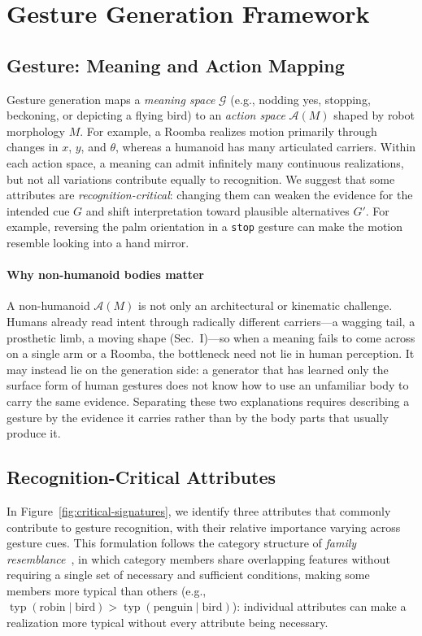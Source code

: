 \documentclass[letterpaper,10pt,conference]{ieeeconf}
\begin{document}
\section{Gesture Generation Framework}
\label{sec:gesture}

\subsection{Gesture: Meaning and Action Mapping}

Gesture generation maps a \emph{meaning space} $\mathcal{G}$ (e.g., nodding yes, stopping, beckoning, or depicting a flying bird) to an \emph{action space} $\mathcal{A}(M)$ shaped by robot morphology $M$. For example, a Roomba realizes motion primarily through changes in $x$, $y$, and $\theta$, whereas a humanoid has many articulated carriers. Within each action space, a meaning can admit infinitely many continuous realizations, but not all variations contribute equally to recognition. We suggest that some attributes are \emph{recognition-critical}: changing them can weaken the evidence for the intended cue $G$ and shift interpretation toward plausible alternatives $G'$. For example, reversing the palm orientation in a \texttt{stop} gesture can make the motion resemble looking into a hand mirror.

\paragraph{Why non-humanoid bodies matter}
A non-humanoid $\mathcal{A}(M)$ is not only an architectural or kinematic challenge. Humans already read intent through radically different carriers---a wagging tail, a prosthetic limb, a moving shape (Sec.~I)---so when a meaning fails to come across on a single arm or a Roomba, the bottleneck need not lie in human perception. It may instead lie on the generation side: a generator that has learned only the surface form of human gestures does not know how to use an unfamiliar body to carry the same evidence. Separating these two explanations requires describing a gesture by the evidence it carries rather than by the body parts that usually produce it.

\subsection{Recognition-Critical Attributes}
\label{sec3.2}
In Figure~\ref{fig:critical-signatures}, we identify three attributes that commonly contribute to gesture recognition, with their relative importance varying across gesture cues. This formulation follows the category structure of \textit{family resemblance}~\cite{rosch1975family}, in which category members share overlapping features without requiring a single set of necessary and sufficient conditions, making some members more typical than others (e.g., $\operatorname{typ}(\text{robin}\mid\text{bird}) > \operatorname{typ}(\text{penguin}\mid\text{bird})$): individual attributes can make a realization more typical without every attribute being necessary.
\end{document}

